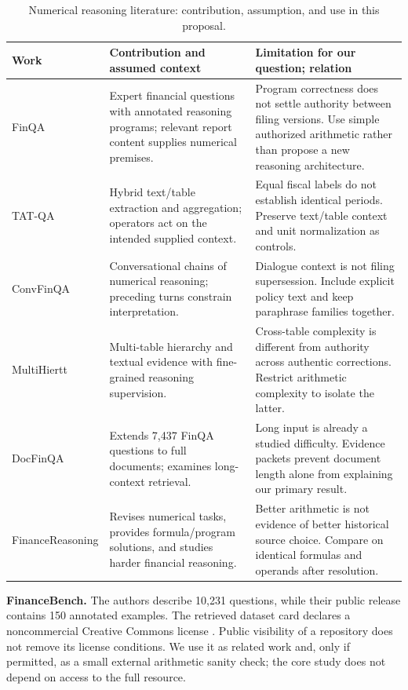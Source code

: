 \documentclass[11pt,a4paper]{article}
\newcommand{\lead}[1]{\textbf{\color{navy}#1}}
\begin{document}
\begin{table}[H]\small\centering
\caption{Numerical reasoning literature: contribution, assumption, and use in this proposal.}
\begin{tabularx}{\linewidth}{p{28mm}YY}\toprule
Work & Contribution and assumed context & Limitation for our question; relation\\\midrule
FinQA \cite{finqa} & Expert financial questions with annotated reasoning programs; relevant report content supplies numerical premises. & Program correctness does not settle authority between filing versions. Use simple authorized arithmetic rather than propose a new reasoning architecture.\\
TAT-QA \cite{tatqa} & Hybrid text/table extraction and aggregation; operators act on the intended supplied context. & Equal fiscal labels do not establish identical periods. Preserve text/table context and unit normalization as controls.\\
ConvFinQA \cite{convfinqa} & Conversational chains of numerical reasoning; preceding turns constrain interpretation. & Dialogue context is not filing supersession. Include explicit policy text and keep paraphrase families together.\\
MultiHiertt \cite{multihiertt} & Multi-table hierarchy and textual evidence with fine-grained reasoning supervision. & Cross-table complexity is different from authority across authentic corrections. Restrict arithmetic complexity to isolate the latter.\\
DocFinQA \cite{docfinqa} & Extends 7,437 FinQA questions to full documents; examines long-context retrieval. & Long input is already a studied difficulty. Evidence packets prevent document length alone from explaining our primary result.\\
FinanceReasoning \cite{financereasoning} & Revises numerical tasks, provides formula/program solutions, and studies harder financial reasoning. & Better arithmetic is not evidence of better historical source choice. Compare on identical formulas and operands after resolution.\\\bottomrule
\end{tabularx}\end{table}

\lead{FinanceBench.} The authors describe 10,231 questions, while their public release contains 150 annotated examples. The retrieved dataset card declares a noncommercial Creative Commons license \cite{financebench}. Public visibility of a repository does not remove its license conditions. We use it as related work and, only if permitted, as a small external arithmetic sanity check; the core study does not depend on access to the full resource.
\end{document}
